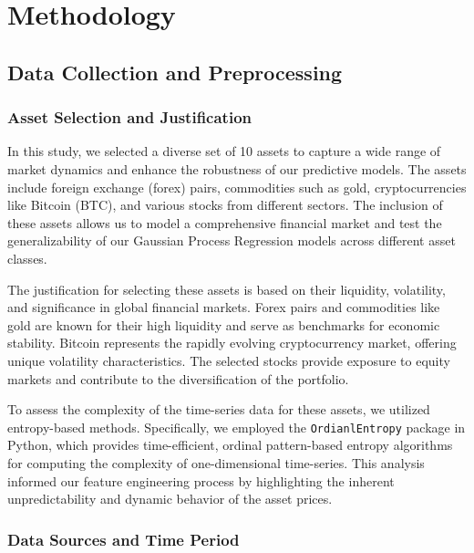 
\chapter{Methodology}\label{chapter:methodology}

\section{Data Collection and Preprocessing}

\subsection{Asset Selection and Justification}

In this study, we selected a diverse set of 10 assets to capture a wide range of market dynamics and enhance the robustness of our predictive models. The assets include foreign exchange (forex) pairs, commodities such as gold, cryptocurrencies like Bitcoin (BTC), and various stocks from different sectors. The inclusion of these assets allows us to model a comprehensive financial market and test the generalizability of our Gaussian Process Regression models across different asset classes.

The justification for selecting these assets is based on their liquidity, volatility, and significance in global financial markets. Forex pairs and commodities like gold are known for their high liquidity and serve as benchmarks for economic stability. Bitcoin represents the rapidly evolving cryptocurrency market, offering unique volatility characteristics. The selected stocks provide exposure to equity markets and contribute to the diversification of the portfolio.

To assess the complexity of the time-series data for these assets, we utilized entropy-based methods. Specifically, we employed the \texttt{OrdianlEntropy} package in Python, which provides time-efficient, ordinal pattern-based entropy algorithms for computing the complexity of one-dimensional time-series. This analysis informed our feature engineering process by highlighting the inherent unpredictability and dynamic behavior of the asset prices.

\subsection{Data Sources and Time Period}

